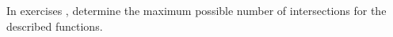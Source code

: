 {\noindent In exercises}
{, determine the maximum possible number of intersections for the described functions.}
